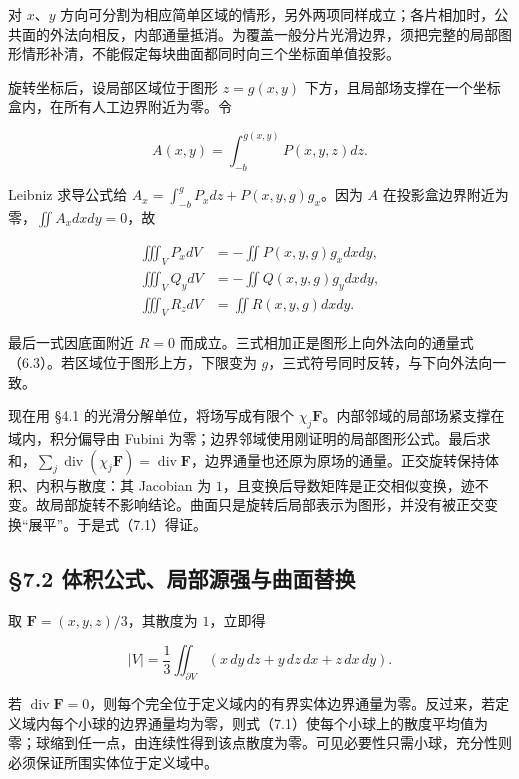 \documentclass[11pt,a4paper]{article}
\begin{document}
对 \(x\)、\(y\)
方向可分割为相应简单区域的情形，另外两项同样成立；各片相加时，公共面的外法向相反，内部通量抵消。为覆盖一般分片光滑边界，须把完整的局部图形情形补清，不能假定每块曲面都同时向三个坐标面单值投影。

旋转坐标后，设局部区域位于图形 \(z=g(x,y)\)
下方，且局部场支撑在一个坐标盒内，在所有人工边界附近为零。令

\begin{equation*}
 A(x,y)=\int_{-b}^{g(x,y)}P(x,y,z)dz.
\end{equation*}

Leibniz 求导公式给 \(A_x=\int_{-b}^{g}P_xdz+P(x,y,g)g_x\)。因为 \(A\)
在投影盒边界附近为零，\(\iint A_xdxdy=0\)，故

\begin{equation*}
\begin{aligned}
 \iiint_VP_xdV&=-\iint P(x,y,g)g_xdxdy,\\
 \iiint_VQ_ydV&=-\iint Q(x,y,g)g_ydxdy,\\
 \iiint_VR_zdV&=\iint R(x,y,g)dxdy.
\end{aligned}
\end{equation*}

最后一式因底面附近 \(R=0\)
而成立。三式相加正是图形上向外法向的通量式（6.3）。若区域位于图形上方，下限变为
\(g\)，三式符号同时反转，与下向外法向一致。

现在用 §4.1 的光滑分解单位，将场写成有限个
\(\chi_j\mathbf F\)。内部邻域的局部场紧支撑在域内，积分偏导由 Fubini
为零；边界邻域使用刚证明的局部图形公式。最后求和，\(\sum_j\operatorname{div}(\chi_j\mathbf F)=\operatorname{div}\mathbf F\)，边界通量也还原为原场的通量。正交旋转保持体积、内积与散度：其
Jacobian 为
\(1\)，且变换后导数矩阵是正交相似变换，迹不变。故局部旋转不影响结论。曲面只是旋转后局部表示为图形，并没有被正交变换``展平''。于是式（7.1）得证。

\subsection{§7.2
体积公式、局部源强与曲面替换}\label{ux4f53ux79efux516cux5f0fux5c40ux90e8ux6e90ux5f3aux4e0eux66f2ux9762ux66ffux6362}

取 \(\mathbf F=(x,y,z)/3\)，其散度为 \(1\)，立即得

\begin{equation*}
 |V|=\frac13\iint_{\partial V}(x\,dy\,dz+y\,dz\,dx+z\,dx\,dy).\tag{7.2}
\end{equation*}

若
\(\operatorname{div}\mathbf F=0\)，则每个完全位于定义域内的有界实体边界通量为零。反过来，若定义域内每个小球的边界通量均为零，则式（7.1）使每个小球上的散度平均值为零；球缩到任一点，由连续性得到该点散度为零。可见必要性只需小球，充分性则必须保证所围实体位于定义域中。
\end{document}
